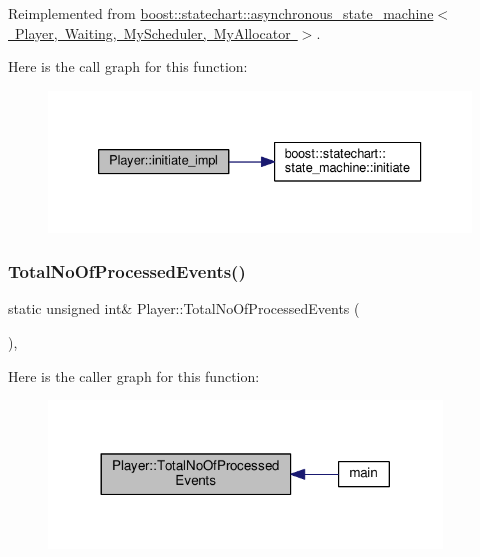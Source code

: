 Reimplemented from \mbox{\hyperlink{classboost_1_1statechart_1_1asynchronous__state__machine_a346bde99a27dc391a0c4beb8c728dce0}{boost\+::statechart\+::asynchronous\+\_\+state\+\_\+machine$<$ Player, Waiting, My\+Scheduler, My\+Allocator $>$}}.

Here is the call graph for this function\+:
\nopagebreak
\begin{figure}[H]
\begin{center}
\leavevmode
\includegraphics[width=333pt]{struct_player_ae5001b1a7c1ba022d7bdb6d7da25e647_cgraph}
\end{center}
\end{figure}
\mbox{\label{struct_player_a208d33c3bba5ae2d6617125813209713}} 
\subsubsection{\texorpdfstring{Total\+No\+Of\+Processed\+Events()}{TotalNoOfProcessedEvents()}}
{\footnotesize\ttfamily static unsigned int\& Player\+::\+Total\+No\+Of\+Processed\+Events (\begin{DoxyParamCaption}{ }\end{DoxyParamCaption})\hspace{0.3cm}{\ttfamily [inline]}, {\ttfamily [static]}}

Here is the caller graph for this function\+:
\nopagebreak
\begin{figure}[H]
\begin{center}
\leavevmode
\includegraphics[width=296pt]{struct_player_a208d33c3bba5ae2d6617125813209713_icgraph}
\end{center}
\end{figure}


